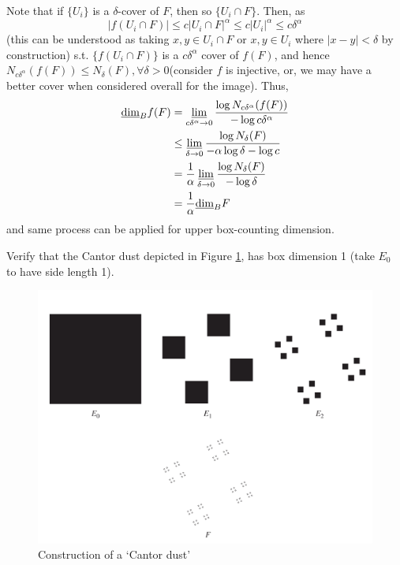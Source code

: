 \documentclass[12pt, a4paper]{article}
\begin{document}
\begin{customsol}{2.2}
    Note that if $\{U_i\}$ is a $\delta$-cover of $F$, then so $\{U_i\cap F\}$. Then, as
    $$
    |f(U_i\cap F)|\leq c|U_i\cap F|^\alpha\leq c|U_i|^\alpha\leq c\delta^\alpha
    $$
    (this can be understood as taking $x, y\in U_i\cap F$ or $x, y\in U_i$ where $|x-y|<\delta$ by construction)
    s.t. $\{f(U_i\cap F)\}$ is a $c\delta^\alpha$ cover of $f(F)$, and hence $N_{c\delta^\alpha}(f(F)) \leq N_\delta(F), \forall \delta>0$(consider $f$ is injective, or, we may have a better cover when considered overall for the image). Thus,
    $$
    \begin{aligned} \underline{\operatorname{dim}}_{B} f(F) &=\varliminf_{c \delta^{\alpha} \rightarrow 0} \frac{\log N_{c \delta^{\alpha}}(f(F))}{-\log c \delta^{\alpha}} \\
        &\leq \varliminf_{\delta \rightarrow 0} \frac{\log N_{\delta}(F)}{-\alpha \log \delta-\log c} \\ &=\frac{1}{\alpha} \varliminf_{\delta \rightarrow 0} \frac{\log N_{\delta}(F)}{-\log \delta}\\
        &=\frac{1}{\alpha} \underline{\operatorname{dim}}_{B} F \end{aligned}
    $$
    and same process can be applied for upper box-counting dimension. 
\end{customsol}


\begin{customexercise}{2.4}\label{calculation}
    Verify that the Cantor dust depicted in Figure \ref{fig:cantordust}, has box dimension 1 (take $E_{0}$ to have side length 1).
    \begin{figure}[H]
        \centering
        \includegraphics[width=.66\textwidth]{images/cantordust.png}
        \caption{ Construction of a ‘Cantor dust’ }
        \label{fig:cantordust}
    \end{figure}
\end{customexercise}
\end{document}
